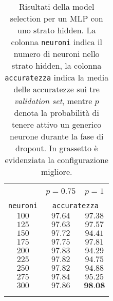 \vspace*{\fill}
\begin{center}

\begin{table}[]
  \small
  \caption{Risultati della model selection per un MLP con uno strato hidden. La colonna \texttt{neuroni} indica il numero di neuroni nello strato hidden, la colonna \texttt{accuratezza} indica  la media delle accuratezze sui tre \textit{validation set}, mentre $p$ denota la probabilità di tenere attivo un generico neurone durante la fase di dropout. In grassetto è evidenziata la configurazione migliore.}\label{tab:modselmnist}
\begin{center}
\begin{tabular}{@{}cc|c@{}}

\hline\\[-11pt]
\hline\\[-6.5pt]
& $p=0.75$ & $p=1$ \\[5pt]
\hline\\[-11pt]
\texttt{neuroni} & \multicolumn{2}{c}{\texttt{accuratezza}} \\[1pt]
$100$ & $97.64$ & $97.38$ \\ [1pt]
$125$ & $97.63$ & $97.57$ \\ [1pt]
$150$ & $97.72$ & $94.41$ \\ [1pt]
$175$ & $97.75$ & $97.81$ \\ [1pt]
$200$ & $97.83$ & $94.29$ \\ [1pt]
$225$ & $97.82$ & $94.75$ \\ [1pt]
$250$ & $97.82$ & $94.88$ \\ [1pt]
$275$ & $97.84$ & $95.25$ \\ [1pt]
$300$ & $97.86$ & $\textbf{98.08}$ \\ [1pt]
\hline\\[-11pt]
\hline\\[-8pt]
\end{tabular}\\[5pt]
\end{center}
\normalsize
\end{table}
\end{center}

